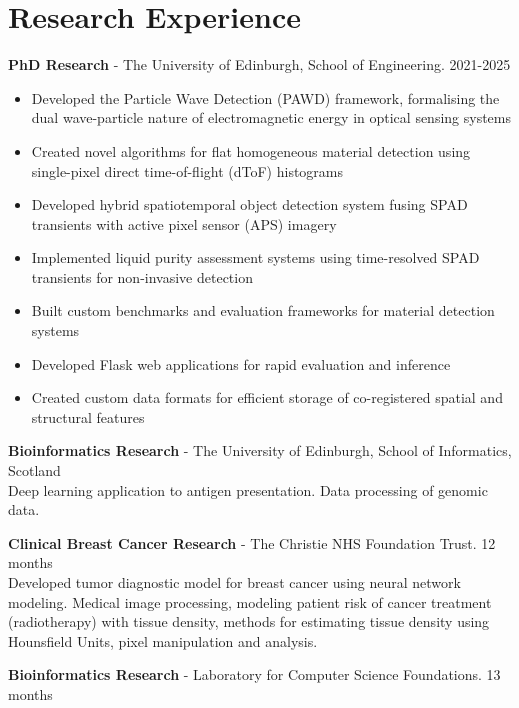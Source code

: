 \documentclass[11pt,a4paper]{article}
\begin{document}
\section*{Research Experience}
\textbf{PhD Research} - The University of Edinburgh, School of Engineering. 2021-2025\\
\begin{itemize}[leftmargin=*,nosep]
    \item Developed the Particle Wave Detection (PAWD) framework, formalising the dual wave-particle nature of electromagnetic energy in optical sensing systems
    \item Created novel algorithms for flat homogeneous material detection using single-pixel direct time-of-flight (dToF) histograms
    \item Developed hybrid spatiotemporal object detection system fusing SPAD transients with active pixel sensor (APS) imagery
    \item Implemented liquid purity assessment systems using time-resolved SPAD transients for non-invasive detection
    \item Built custom benchmarks and evaluation frameworks for material detection systems
    \item Developed Flask web applications for rapid evaluation and inference
    \item Created custom data formats for efficient storage of co-registered spatial and structural features
\end{itemize}

\textbf{Bioinformatics Research} - The University of Edinburgh, School of Informatics, Scotland\\
Deep learning application to antigen presentation. Data processing of genomic data.

\textbf{Clinical Breast Cancer Research} - The Christie NHS Foundation Trust. 12 months\\
Developed tumor diagnostic model for breast cancer using neural network modeling. Medical image processing, modeling patient risk of cancer treatment (radiotherapy) with tissue density, methods for estimating tissue density using Hounsfield Units, pixel manipulation and analysis.

\textbf{Bioinformatics Research} - Laboratory for Computer Science Foundations. 13 months
\end{document}
